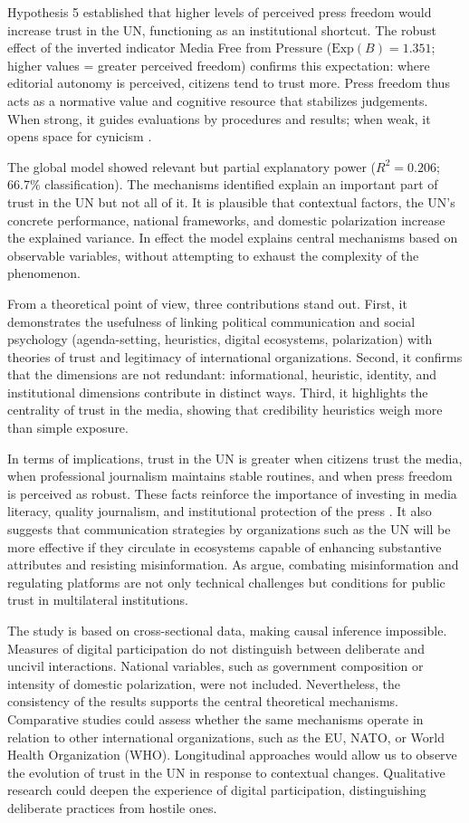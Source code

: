 \documentclass[english]{textolivre}
\begin{document}
Hypothesis 5 established that higher levels of perceived press freedom would increase trust in the UN, functioning as an institutional shortcut. The robust effect of the inverted indicator Media Free from Pressure ($\text{Exp}(B)=1.351$; higher values = greater perceived freedom) confirms this expectation: where editorial autonomy is perceived, citizens tend to trust more. Press freedom thus acts as a normative value and cognitive resource that stabilizes judgements. When strong, it guides evaluations by procedures and results; when weak, it opens space for cynicism \cite{dellmuth2020}.

The global model showed relevant but partial explanatory power ($R^2=0.206$; 66.7\% classification). The mechanisms identified explain an important part of trust in the UN but not all of it. It is plausible that contextual factors, the UN’s concrete performance, national frameworks, and domestic polarization increase the explained variance. In effect the model explains central mechanisms based on observable variables, without attempting to exhaust the complexity of the phenomenon.

From a theoretical point of view, three contributions stand out. First, it demonstrates the usefulness of linking political communication and social psychology (agenda-setting, heuristics, digital ecosystems, polarization) with theories of trust and legitimacy of international organizations. Second, it confirms that the dimensions are not redundant: informational, heuristic, identity, and institutional dimensions contribute in distinct ways. Third, it highlights the centrality of trust in the media, showing that credibility heuristics weigh more than simple exposure.

In terms of implications, trust in the UN is greater when citizens trust the media, when professional journalism maintains stable routines, and when press freedom is perceived as robust. These facts reinforce the importance of investing in media literacy, quality journalism, and institutional protection of the press \cite{norris2011}. It also suggests that communication strategies by organizations such as the UN will be more effective if they circulate in ecosystems capable of enhancing substantive attributes and resisting misinformation. As \textcite{wardle2017} argue, combating misinformation and regulating platforms are not only technical challenges but conditions for public trust in multilateral institutions.

The study is based on cross-sectional data, making causal inference impossible. Measures of digital participation do not distinguish between deliberate and uncivil interactions. National variables, such as government composition or intensity of domestic polarization, were not included. Nevertheless, the consistency of the results supports the central theoretical mechanisms. Comparative studies could assess whether the same mechanisms operate in relation to other international organizations, such as the EU, NATO, or World Health Organization (WHO). Longitudinal approaches would allow us to observe the evolution of trust in the UN in response to contextual changes. Qualitative research could deepen the experience of digital participation, distinguishing deliberate practices from hostile ones.
\end{document}
